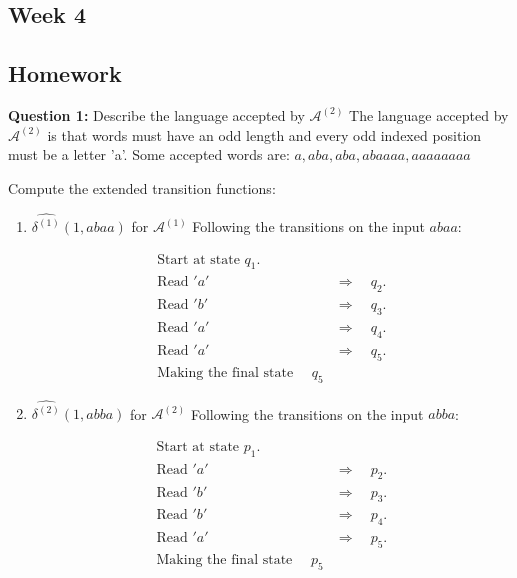 \documentclass{article}
\theoremstyle{theorem}
\theoremstyle{definition}
\theoremstyle{remark}
\begin{document}
\subsection{Week 4}
\smallskip


\subsection*{Homework}

\textbf{Question 1:} Describe the language accepted by $\mathcal{A}^{(2)}$
The language accepted by $\mathcal{A}^{(2)}$ is that words must have an odd length and every odd indexed position must be a letter 'a'.
Some accepted words are: $a, aba, aba, abaaaa, aaaaaaaa$

\smallskip

Compute the extended transition functions: \\

\begin{enumerate}
    \item \( \widehat{\delta^{(1)}}(1, abaa) \) for \( \mathcal{A}^{(1)} \)
     Following the transitions on the input \( abaa \):

    \begin{align*}
        \text{Start at state } q_1. \\
        \text{Read } 'a' \quad &\Rightarrow \quad q_2. \\
        \text{Read } 'b' \quad &\Rightarrow \quad q_3. \\
        \text{Read } 'a' \quad &\Rightarrow \quad q_4. \\
        \text{Read } 'a' \quad &\Rightarrow \quad q_5. \\
        \text{Making the final state } \quad q_5 
    \end{align*}
    
    \item \( \widehat{\delta^{(2)}}(1, abba) \) for \( \mathcal{A}^{(2)} \)
    Following the transitions on the input \( abba \):

    \begin{align*}
        \text{Start at state } p_1. \\
        \text{Read } 'a' \quad &\Rightarrow \quad p_2. \\
        \text{Read } 'b' \quad &\Rightarrow \quad p_3. \\
        \text{Read } 'b' \quad &\Rightarrow \quad p_4. \\
        \text{Read } 'a' \quad &\Rightarrow \quad p_5. \\
        \text{Making the final state } \quad p_5 
    \end{align*}

\end{enumerate}
\end{document}

